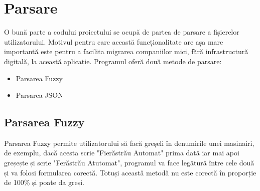\documentclass[12pt, twoside]{article}
\begin{document}
\section{Parsare}

O bună parte a codului proiectului se ocupă
de partea de parsare a fișierelor utilizatorului.
Motivul pentru care această funcționalitate are
așa mare importantă este pentru a facilita migrarea
companiilor mici, fără infrastructură digitală, la
această aplicație. Programul oferă două metode de parsare:
\begin{itemize}
  \item Parsarea Fuzzy
  \item Parsarea JSON
\end{itemize}

\subsection{Parsarea Fuzzy}
Parsarea Fuzzy permite utilizatorului să facă greșeli
în denumirile unei masinairi, de exemplu, dacă acesta
scrie "Fierăstrău Automat" prima dată iar mai apoi greșește
și scrie "Ferăstrău Atutomat", programul va face legătură
între cele două și va folosi formularea corectă. Totuși
această metodă nu este corectă în proporție de 100\% și poate
da greși.
\end{document}
